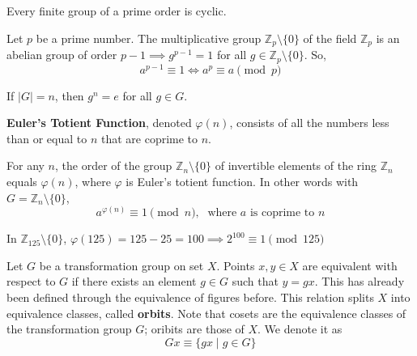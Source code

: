 \documentclass{article}
\begin{document}
    \begin{corollary}
      Every finite group of a prime order is cyclic. 
    \end{corollary}

    \begin{theorem}
      Let $p$ be a prime number. The multiplicative group $\mathbb{Z}_{p} \setminus \{0\}$ of the field $\mathbb{Z}_{p}$ is an abelian group of order $p-1 \implies g^{p-1} = 1$ for all $g \in \mathbb{Z}_{p} \setminus \{0\}$. So,
      \begin{equation}
        a^{p-1} \equiv 1 \iff a^{p} \equiv a \pmod{p}
      \end{equation}
    \end{theorem}

    \begin{corollary}
      If $|G| = n$, then $g^{n} = e$ for all $g \in G$. 
    \end{corollary}

    \begin{definition}
      \textbf{Euler's Totient Function}, denoted $\varphi(n)$, consists of all the numbers less than or equal to $n$ that are coprime to $n$. 
    \end{definition}

    \begin{theorem}
      For any $n$, the order of the group $\mathbb{Z}_{n} \setminus \{0\}$ of invertible elements of the ring $\mathbb{Z}_{n}$ equals $\varphi(n)$, where $\varphi$ is Euler's totient function. In other words with $G = \mathbb{Z}_{n} \setminus \{0\}$, 
      \begin{equation}
        a^{\varphi(n)} \equiv 1 \pmod{n}, \; \text{ where $a$ is coprime to $n$}
      \end{equation}
    \end{theorem}

    \begin{example}
      In $\mathbb{Z}_{125} \setminus \{0\}$, $\varphi(125) = 125 - 25 = 100 \implies 2^{100} \equiv 1 \pmod{125}$
    \end{example}

    \begin{definition}
      Let $G$ be a transformation group on set $X$. Points $x, y \in X$ are equivalent with respect to $G$ if there exists an element $g \in G$ such that $y = g x$. This has already been defined through the equivalence of figures before. This relation splits $X$ into equivalence classes, called \textbf{orbits}. Note that cosets are the equivalence classes of the transformation group $G$; oribits are those of $X$. We denote it as
      \begin{equation}
        Gx \equiv \{ g x \;|\;g \in G \}
      \end{equation}
    \end{definition}
\end{document}
